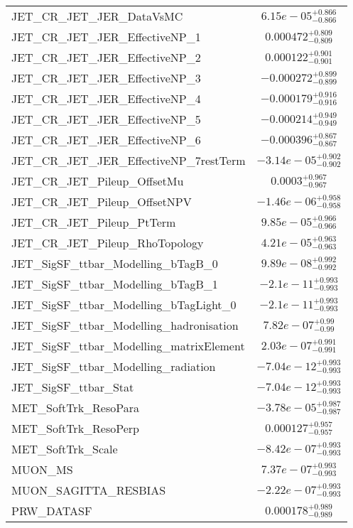 \begin{tabular}{|l|c|}
JET\_CR\_JET\_JER\_DataVsMC & $6.15e-05^{+0.866}_{-0.866}$ \\
JET\_CR\_JET\_JER\_EffectiveNP\_1 & $0.000472^{+0.809}_{-0.809}$ \\
JET\_CR\_JET\_JER\_EffectiveNP\_2 & $0.000122^{+0.901}_{-0.901}$ \\
JET\_CR\_JET\_JER\_EffectiveNP\_3 & $-0.000272^{+0.899}_{-0.899}$ \\
JET\_CR\_JET\_JER\_EffectiveNP\_4 & $-0.000179^{+0.916}_{-0.916}$ \\
JET\_CR\_JET\_JER\_EffectiveNP\_5 & $-0.000214^{+0.949}_{-0.949}$ \\
JET\_CR\_JET\_JER\_EffectiveNP\_6 & $-0.000396^{+0.867}_{-0.867}$ \\
JET\_CR\_JET\_JER\_EffectiveNP\_7restTerm & $-3.14e-05^{+0.902}_{-0.902}$ \\
JET\_CR\_JET\_Pileup\_OffsetMu & $0.0003^{+0.967}_{-0.967}$ \\
JET\_CR\_JET\_Pileup\_OffsetNPV & $-1.46e-06^{+0.958}_{-0.958}$ \\
JET\_CR\_JET\_Pileup\_PtTerm & $9.85e-05^{+0.966}_{-0.966}$ \\
JET\_CR\_JET\_Pileup\_RhoTopology & $4.21e-05^{+0.963}_{-0.963}$ \\
JET\_SigSF\_ttbar\_Modelling\_bTagB\_0 & $9.89e-08^{+0.992}_{-0.992}$ \\
JET\_SigSF\_ttbar\_Modelling\_bTagB\_1 & $-2.1e-11^{+0.993}_{-0.993}$ \\
JET\_SigSF\_ttbar\_Modelling\_bTagLight\_0 & $-2.1e-11^{+0.993}_{-0.993}$ \\
JET\_SigSF\_ttbar\_Modelling\_hadronisation & $7.82e-07^{+0.99}_{-0.99}$ \\
JET\_SigSF\_ttbar\_Modelling\_matrixElement & $2.03e-07^{+0.991}_{-0.991}$ \\
JET\_SigSF\_ttbar\_Modelling\_radiation & $-7.04e-12^{+0.993}_{-0.993}$ \\
JET\_SigSF\_ttbar\_Stat & $-7.04e-12^{+0.993}_{-0.993}$ \\
MET\_SoftTrk\_ResoPara & $-3.78e-05^{+0.987}_{-0.987}$ \\
MET\_SoftTrk\_ResoPerp & $0.000127^{+0.957}_{-0.957}$ \\
MET\_SoftTrk\_Scale & $-8.42e-07^{+0.993}_{-0.993}$ \\
MUON\_MS & $7.37e-07^{+0.993}_{-0.993}$ \\
MUON\_SAGITTA\_RESBIAS & $-2.22e-07^{+0.993}_{-0.993}$ \\
PRW\_DATASF & $0.000178^{+0.989}_{-0.989}$ \\

\end{tabular}
